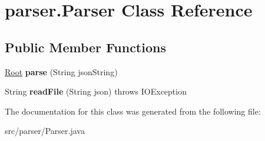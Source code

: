 \hypertarget{classparser_1_1_parser}{}\section{parser.\+Parser Class Reference}
\label{classparser_1_1_parser}
\subsection*{Public Member Functions}
\begin{DoxyCompactItemize}
\item 
\hyperlink{classparser_1_1_root}{Root} {\bfseries parse} (String json\+String)\hypertarget{classparser_1_1_parser_adcfa44cabe339c507e5acda771a2b51a}{}\label{classparser_1_1_parser_adcfa44cabe339c507e5acda771a2b51a}

\item 
String {\bfseries read\+File} (String json)  throws I\+O\+Exception \hypertarget{classparser_1_1_parser_aeff524da716a29cfd44f1fa675f895ee}{}\label{classparser_1_1_parser_aeff524da716a29cfd44f1fa675f895ee}

\end{DoxyCompactItemize}


The documentation for this class was generated from the following file\+:\begin{DoxyCompactItemize}
\item 
src/parser/Parser.\+java\end{DoxyCompactItemize}
